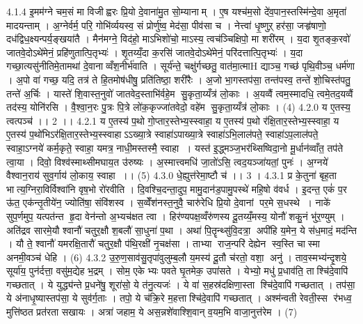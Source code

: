 4.1.4
इ॒मम॑ग्ने चम॒सं मा विजीह्वरः प्रि॒यो दे॒वाना॑मु॒त सो॒म्यानाम् । ए॒ष यश्च॑म॒सो दे॑व॒पान॒स्तस्मि॑न्दे॒वा अ॒मृता॑ मादयन्ताम् । अ॒ग्नेर्वर्म॒ परि॒ गोभि॑र्व्ययस्व॒ सं प्रोर्णु॑ष्व॒ मेद॑सा॒ पीव॑सा च । नेत्त्वा॑ धृ॒ष्णुऱ् हर॑सा॒ जऱ्हृ॑षाणो॒ दध॑द्विध॒क्ष्यन्पर्य॒ङ्खया॑तै । मैन॑मग्ने॒ विद॑हो॒ माऽभिशो॑चो॒ माऽस्य॒ त्वच॑ञ्चिक्षिपो॒ मा शरी॑रम् । य॒दा शृ॒तङ्क॒रवो॑ जातवे॒दोऽथे॑मेनं॒ प्रहि॑णुतात्पि॒तृभ्यः॑ । शृ॒तय्यँ॒दा क॒रसि॑ जातवे॒दोऽथे॑मेनं॒ परि॑दत्तात्पि॒तृभ्यः॑ । य॒दा गच्छा॒त्यसु॑नीतिमे॒तामथा॑ दे॒वानाव्वँश॒नीर्भ॑वाति । सूर्य॑न्ते॒ चक्षु॑र्गच्छतु॒ वात॑मा॒त्माH द्याञ्च॒ गच्छ॑ पृथि॒वीञ्च॒ धर्म॑णा । अ॒पो वा॑ गच्छ॒ यदि॒ तत्र॑ ते हि॒तमोष॑धीषु॒ प्रति॑तिष्ठा॒ शरी॑रैः । अ॒जो भा॒गस्तप॑सा॒ तन्त॑पस्व॒ तन्ते॑ शो॒चिस्त॑पतु॒ तन्ते॑ अ॒र्चिः । यास्ते॑ शि॒वास्त॒नुवो॑ जातवेद॒स्ताभि॑र्वहे॒म सु॒कृता॒य्यँत्र॑ लो॒काः । अ॒यव्वैं त्वम॒स्मादधि॒ त्वमे॒तद॒यव्वैं तद॑स्य॒ योनि॑रसि । वै॒श्वा॒न॒रः पु॒त्रः पि॒त्रे लो॑क॒कृज्जा॑तवेदो॒ वहे॑म सु॒कृता॒य्यँत्र॑ लो॒काः । (4)
4.2.0
य ए॒तस्य॒ त्वत्पञ्च॑ ।। 2 ।।
4.2.1
य ए॒तस्य॑ प॒थो गो॒प्तार॒स्तेभ्य॒स्स्वाहा॒ य ए॒तस्य॑ प॒थो र॑क्षि॒तार॒स्तेभ्य॒स्स्वाहा॒ य ए॒तस्य॑ प॒थो॑भिऽर॑क्षि॒तार॒स्तेभ्य॒स्स्वाहाऽऽख्या॒त्रे स्वाहा॑ऽपाख्या॒त्रे स्वाहा॑ऽभि॒लाल॑पते॒ स्वाहा॑ऽप॒लाल॑पते॒ स्वाहा॒ऽग्नये॑ कर्म॒कृते॒ स्वाहा॒ यमत्र॒ नाधी॒मस्तस्मै॒ स्वाहा । यस्त॑ इ॒द्ध्मञ्ज॒भर॑थ्सिष्विदा॒नो मू॒र्धान॑व्वाँत॒ तप॑ते त्वा॒या । दिवो॒ विश्व॑स्माथ्सीमघाय॒त उ॑रुष्यः । अ॒स्मात्त्वमधि॑ जा॒तो॑ऽसि॒ त्वद॒यञ्जा॑यतां॒ पुनः॑ । अ॒ग्नये॑ वैश्वान॒राय॑ सुव॒र्गाय॑ लो॒काय॒ स्वाहा ।। (5)
4.3.0
धे॒ह्युत्त॑रेमा॒ष्टौ च॑ ।। 3 ।
4.3.1
प्र के॒तुना॑ बृह॒ता भात्य॒ग्निरा॒विर्विश्वा॑नि वृष॒भो रो॑रवीति । दि॒वश्चि॒दन्ता॒दुप॒ मामु॒दान॑ड॒पामु॒पस्थे॑ महि॒षो व॑वर्ध । इ॒दन्त॒ एकं॑ प॒र ऊ॑त॒ एक॑न्तृ॒तीये॑न॒ ज्योति॑षा॒ संवि॑शस्व । स॒व्वेँश॑नस्त॒नुवै॒ चारु॑रेधि प्रि॒यो दे॒वानां पर॒मे स॒धस्थे । नाके॑ सुप॒र्णमुप॒ यत्पत॑न्त हृ॒दा वेन॑न्तो अ॒भ्यच॑क्षत त्वा । हिर॑ण्यपक्ष॒व्वँरु॑णस्य दू॒तय्यँ॒मस्य॒ योनौ॑ शकु॒नं भु॑र॒ण्युम् । अति॑द्रव सारमे॒यौ श्वानौ॑ चतुर॒क्षौ श॒बलौ॑ सा॒धुना॑ प॒था । अथा॑ पि॒तॄन्थ्सु॑वि॒दत्रा॒॒ अपी॑हि य॒मेन॒ ये स॑ध॒मादं॒ मद॑न्ति । यौ ते॒ श्वानौ॑ यमरक्षि॒तारौ॑ चतुर॒क्षौ प॑थि॒रक्षी॑ नृ॒चक्ष॑सा । ताभ्या॑ राज॒न्परि॑ देह्येन स्व॒स्ति चास्मा अनमी॒वञ्च॑ धेहि । (6)
4.3.2
उ॒रु॒ण॒साव॑सु॒तृपा॑वुलुम्ब॒लौ य॒मस्य॑ दू॒तौ च॑रतो॒ वशा॒॒ अनु॑ । ताव॒स्मभ्य॑न्दृ॒शये॒ सूर्या॑य॒ पुन॑र्दत्ता॒ वसु॑म॒द्येह भ॒द्रम् । सोम॒ एकेभ्यः पवते घृ॒तमेक॒ उपा॑सते । येभ्यो॒ मधु॑ प्र॒धाव॑ति॒ ताश्चि॑दे॒वापि॑ गच्छतात् । ये युद्ध्य॑न्ते प्र॒धने॑षु॒ शूरा॑सो॒ ये त॑नु॒त्यजः॑ । ये वा॑ स॒हस्र॑दक्षिणा॒स्ता श्चि॑दे॒वापि॑ गच्छतात् । तप॑सा॒ ये अ॑नाधृ॒ष्यास्तप॑सा॒ ये सुव॑र्ग॒ताः । तपो॒ ये च॑क्रि॒रे म॒हत्ताश्चि॑दे॒वापि॑ गच्छतात् । अश्म॑न्वती रेवती॒स्स र॑भध्व॒ मुत्ति॑ष्ठत प्रत॑रता सखायः । अत्रा॑ जहाम॒ ये अस॒न्नशे॑वाश्शि॒वान् व॒यम॒भि वाजा॒नुत्त॑रेम । (7)
